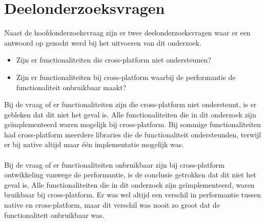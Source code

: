 \section{Deelonderzoeksvragen}
Naast de hoofdonderzoeksvraag zijn er twee deelonderzoeksvragen waar er een antwoord op gezocht werd 
bij het uitvoeren van dit onderzoek. 
\begin{itemize}
    \item Zijn er functionaliteiten die cross-platform niet ondersteunen?
    \item Zijn er functionaliteiten bij cross-platform waarbij de performantie de functionaliteit onbruikbaar maakt?
\end{itemize}
Bij de vraag of er functionaliteiten zijn die cross-platform niet ondersteunt, 
is er gebleken dat dit niet het geval is. Alle functionaliteiten die in dit onderzoek zijn geïmplementeerd
waren mogelijk bij cross-platform. Bij sommige functionaliteiten had cross-platform meerdere libraries 
die de functionaliteit ondersteunden, terwijl er bij native altijd maar één implementatie mogelijk was.
\\\\
Bij de vraag of er functionaliteiten onbruikbaar zijn bij cross-platform ontwikkeling vanwege de performantie, 
is de conclusie getrokken dat dit niet het geval is. Alle functionaliteiten die in dit onderzoek zijn geïmplementeerd,
waren bruikbaar bij cross-platform. Er was wel altijd een verschil in performantie tussen native en cross-platform,
maar dit verschil was nooit zo groot dat de functionaliteit onbruikbaar was.

